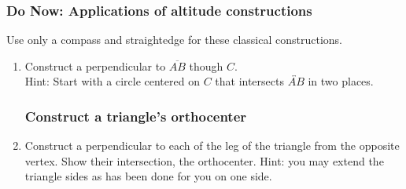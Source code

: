 \documentclass[12pt, oneside]{article}
\begin{document}
\subsubsection*{Do Now: Applications of altitude constructions}
Use only a compass and straightedge for these classical constructions.
  \begin{enumerate}

  \item Construct a perpendicular to $\overline{AB}$ though $C$.\\
  Hint: Start with a circle centered on $C$ that intersects $\overleftrightarrow{AB}$ in two places.
    \vspace{2cm}
    \begin{center}
  \end{center} \vspace{2cm}

\subsubsection*{Construct a triangle's orthocenter}

  \item Construct a perpendicular to each of the leg of the triangle from the opposite vertex. Show their intersection, the orthocenter. Hint: you may extend the triangle sides as has been done for you on one side.%
      \vspace{3cm}
      \begin{center}
      \end{center}


\end{enumerate}
\end{document}
